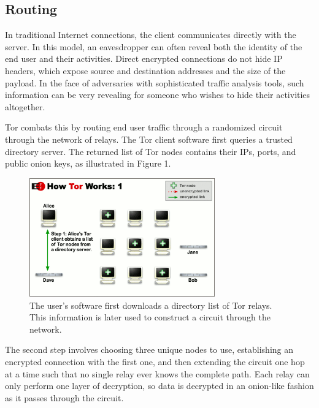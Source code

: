 \documentclass[journal]{IEEEtran}
\begin{document}
\subsection{Routing}

In traditional Internet connections, the client communicates directly with the server. In this model, an eavesdropper can often reveal both the identity of the end user and their activities. Direct encrypted connections do not hide IP headers, which expose source and destination addresses and the size of the payload. In the face of adversaries with sophisticated traffic analysis tools, such information can be very revealing for someone who wishes to hide their activities altogether.

Tor combats this by routing end user traffic through a randomized circuit through the network of relays. The Tor client software first queries a trusted directory server. The returned list of Tor nodes contains their IPs, ports, and public onion keys,\cite{Xin2009} as illustrated in Figure 1.

\begin{figure}[htbp]
\centering
\begin{minipage}{8 cm}
    \includegraphics[width=80mm]{resources/circuit-building-1.png}
    \caption{The user's software first downloads a directory list of Tor relays. This information is later used to construct a circuit through the network.\cite{McCoy2008}\cite{TorOverview}}
\end{minipage}
\end{figure}

The second step involves choosing three unique nodes to use, establishing an encrypted connection with the first one, and then extending the circuit one hop at a time such that no single relay ever knows the complete path. Each relay can only perform one layer of decryption, so data is decrypted in an onion-like fashion as it passes through the circuit.
\end{document}
